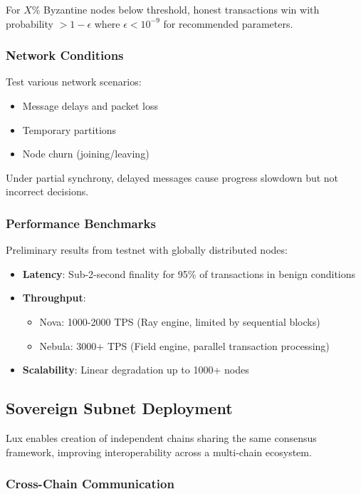 For $X\%$ Byzantine nodes below threshold, honest transactions win with probability $> 1-\epsilon$ where $\epsilon < 10^{-9}$ for recommended parameters.

\subsubsection{Network Conditions}

Test various network scenarios:
\begin{itemize}
\item Message delays and packet loss
\item Temporary partitions
\item Node churn (joining/leaving)
\end{itemize}

Under partial synchrony, delayed messages cause progress slowdown but not incorrect decisions.

\subsubsection{Performance Benchmarks}

Preliminary results from testnet with globally distributed nodes:
\begin{itemize}
\item \textbf{Latency}: Sub-2-second finality for 95\% of transactions in benign conditions
\item \textbf{Throughput}: 
  \begin{itemize}
  \item Nova: 1000-2000 TPS (Ray engine, limited by sequential blocks)
  \item Nebula: 3000+ TPS (Field engine, parallel transaction processing)
  \end{itemize}
\item \textbf{Scalability}: Linear degradation up to 1000+ nodes
\end{itemize}

\subsection{Sovereign Subnet Deployment}

Lux enables creation of independent chains sharing the same consensus framework, improving interoperability across a multi-chain ecosystem.

\subsubsection{Cross-Chain Communication}

